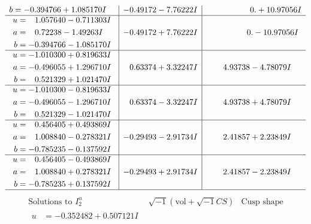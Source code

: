 \documentclass[1p]{elsarticle_modified}
\theoremstyle{definition}
\newcommand{\I}{\sqrt{-1}}
\begin{document}
$$\begin{array}{c|c|c}
\begin{aligned}
b &= -0.394766 + 1.085170 I\end{aligned}
 & -0.49172 - 7.76222 I & \phantom{-0.000000 -}0. + 10.97056 I \\ \hline\begin{aligned}
u &= \phantom{-}1.057640 - 0.711303 I \\
a &= \phantom{-}0.72238 - 1.49263 I \\
b &= -0.394766 - 1.085170 I\end{aligned}
 & -0.49172 + 7.76222 I & \phantom{-0.000000 } 0. - 10.97056 I \\ \hline\begin{aligned}
u &= -1.010300 + 0.819633 I \\
a &= -0.496055 + 1.296710 I \\
b &= \phantom{-}0.521329 + 1.021470 I\end{aligned}
 & \phantom{-}0.63374 + 3.32247 I & \phantom{-}4.93738 - 4.78079 I \\ \hline\begin{aligned}
u &= -1.010300 - 0.819633 I \\
a &= -0.496055 - 1.296710 I \\
b &= \phantom{-}0.521329 - 1.021470 I\end{aligned}
 & \phantom{-}0.63374 - 3.32247 I & \phantom{-}4.93738 + 4.78079 I \\ \hline\begin{aligned}
u &= \phantom{-}0.456405 + 0.493869 I \\
a &= \phantom{-}1.008840 - 0.278321 I \\
b &= -0.785235 - 0.137592 I\end{aligned}
 & -0.29493 - 2.91734 I & \phantom{-}2.41857 + 2.23849 I \\ \hline\begin{aligned}
u &= \phantom{-}0.456405 - 0.493869 I \\
a &= \phantom{-}1.008840 + 0.278321 I \\
b &= -0.785235 + 0.137592 I\end{aligned}
 & -0.29493 + 2.91734 I & \phantom{-}2.41857 - 2.23849 I\\
 \hline 
 \end{array}$$\newpage$$\begin{array}{c|c|c}  
\text{Solutions to }I^u_{2}& \I (\text{vol} + \sqrt{-1}CS) & \text{Cusp shape}\\
 \hline 
\begin{aligned}
u &= -0.352482 + 0.507121 I \\

\end{aligned}
\end{array}$$
\end{document}
